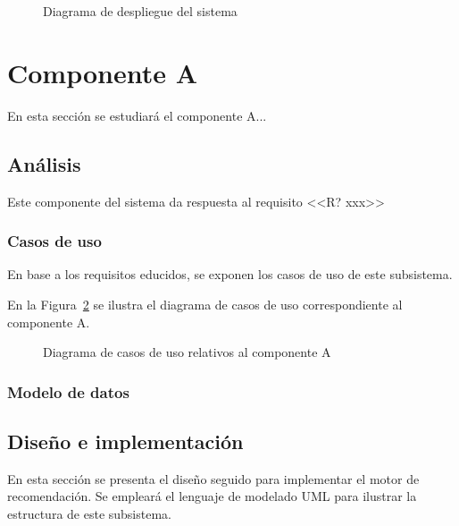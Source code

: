 \begin{figure}[h!]
\centering
\caption{Diagrama de despliegue del sistema}
\label{f:dev:arch-deploy}
\end{figure}


\section{Componente A}
En esta sección se estudiará el componente A...

\subsection{Análisis}
Este componente del sistema da respuesta al requisito <<R? xxx>> 

\subsubsection{Casos de uso}
En base a los requisitos educidos, se exponen los casos de uso de este subsistema.

En la Figura~\ref{f:dev:use-cases-recsys} se ilustra el diagrama de casos de uso correspondiente al componente A.

\begin{figure}[h!]
\centering
\caption{Diagrama de casos de uso relativos al componente A}
\label{f:dev:use-cases-recsys}
\end{figure}

\subsubsection{Modelo de datos}


\subsection{Diseño e implementación}
En esta sección se presenta el diseño seguido para implementar el motor de recomendación. Se empleará el lenguaje de modelado UML para ilustrar la estructura de este subsistema.
